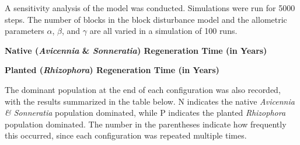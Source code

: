 A sensitivity analysis of the model was conducted. Simulations were run for 5000 steps.
The number of blocks in the block disturbance model and the allometric
parameters $\alpha$, $\beta$, and $\gamma$ are all varied in a simulation of 100 runs.

\textbf{Native (\emph{Avicennia} \& \emph{Sonneratia}) Regeneration Time
(in Years)}


\textbf{Planted (\emph{Rhizophora}) Regeneration Time (in Years)}


The dominant population at the end of each configuration was also
recorded, with the results summarized in the table below. N indicates
the native \emph{Avicennia \& Sonneratia} population dominated, while P
indicates the planted \emph{Rhizophora} population dominated. The number
in the parentheses indicate how frequently this occurred, since each
configuration was repeated multiple times.


